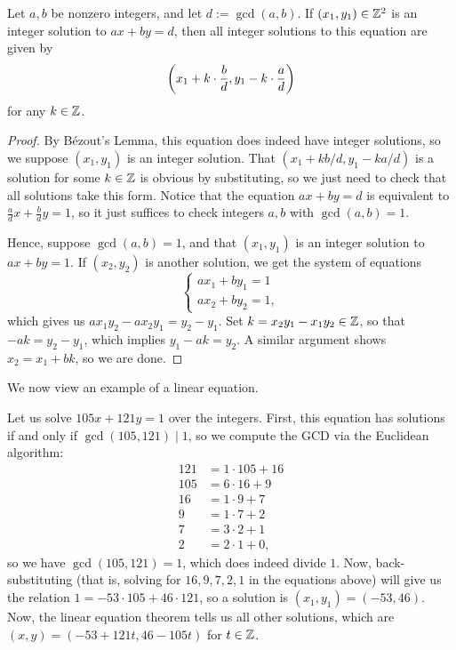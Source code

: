 \documentclass{article}
\begin{document}
\newpage
\begin{theorem}
Let $a,b$ be nonzero integers, and let $d := \gcd(a,b)$. If $(x_1, y_1)\in \mathbb Z^2$ is an integer solution to $ax + by = d$, then all integer solutions to this equation are given by
$$\left(x_1 + k\cdot\frac bd, y_1 - k\cdot \frac ad \right)$$
for any $k\in\mathbb Z$.
\end{theorem}
\begin{proof}
By Bézout's Lemma, this equation does indeed have integer solutions, so we suppose $(x_1, y_1)$ is an integer solution. That $(x_1 + kb/d, y_1 - ka/d)$ is a solution for some $k\in \mathbb Z$ is obvious by substituting, so we just need to check that all solutions take this form. Notice that the equation $ax + by = d$ is equivalent to $\frac ad x + \frac bdy = 1$, so it just suffices to check integers $a,b$ with $\gcd(a,b) = 1$.

Hence, suppose $\gcd(a,b) = 1$, and that $(x_1, y_1)$ is an integer solution to $ax + by = 1$. If $(x_2, y_2)$ is another solution, we get the system of equations
$$\begin{cases}
    ax_1 + by_1 = 1 \\ ax_2 + by_2  =1,
\end{cases}$$
which gives us $ax_1y_2 - ax_2y_1 = y_2-y_1$. Set $k = x_2y_1 - x_1y_2 \in \mathbb Z$, so that $-ak = y_2 - y_1$, which implies $y_1 - ak = y_2$. A similar argument shows $x_2 = x_1 + bk$, so we are done.
\end{proof}

We now view an example of a linear equation.
\begin{example}
Let us solve $105x + 121y = 1$ over the integers. First, this equation has solutions if and only if $\gcd(105, 121)\mid 1$, so we compute the GCD via the Euclidean algorithm:
\begin{align*}
    121 &= 1\cdot 105 + 16\\
    105 &= 6\cdot 16 + 9 \\
    16 &= 1\cdot 9 + 7 \\
    9 &= 1\cdot 7 + 2 \\
    7 &= 3\cdot 2 + 1 \\
    2 &= 2\cdot 1 + 0,
\end{align*}
so we have $\gcd(105, 121) = 1$, which does indeed divide $1$. Now, back-substituting (that is, solving for $16, 9, 7, 2, 1$ in the equations above) will give us the relation $1 = -53 \cdot 105 + 46\cdot 121$, so a solution is $(x_1, y_1) = (-53, 46)$. Now, the linear equation theorem tells us all other solutions, which are $(x,y) = \boxed{(-53 + 121t, 46 - 105t)}$ for $t\in \mathbb Z$.
\end{example}
\end{document}
